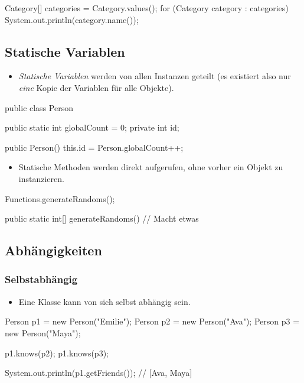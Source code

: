 \documentclass[a4paper,10pt, dvipsnames]{report}
\begin{document}
\begin{javacodebox}
Category[] categories = Category.values();
for (Category category : categories) {
	System.out.println(category.name());
}
\end{javacodebox}

\subsection{Statische Variablen}

\begin{itemize}
	\item \textit{Statische Variablen} werden von allen Instanzen geteilt (es existiert also nur \textit{eine} Kopie der Variablen für alle Objekte).
\end{itemize}

\begin{javacodebox}
public class Person {
	public static int globalCount = 0;
	private int id;

	public Person() {
		this.id = Person.globalCount++;
	}
}
\end{javacodebox}

\begin{itemize}
	\item Statische Methoden werden direkt aufgerufen, ohne vorher ein Objekt zu instanzieren.
\end{itemize}

\begin{javacodebox}
Functions.generateRandoms();

public static int[] generateRandoms() {
	// Macht etwas
}
\end{javacodebox}

\subsection{Abhängigkeiten}

\subsubsection{Selbstabhängig}

\begin{itemize}
	\item Eine Klasse kann von sich selbst abhängig sein.
\end{itemize}

\begin{javacodebox}
Person p1 = new Person("Emilie");
Person p2 = new Person("Ava");
Person p3 = new Person("Maya");

p1.knows(p2);
p1.knows(p3);

System.out.println(p1.getFriends()); // [Ava, Maya]
\end{javacodebox}
\end{document}
